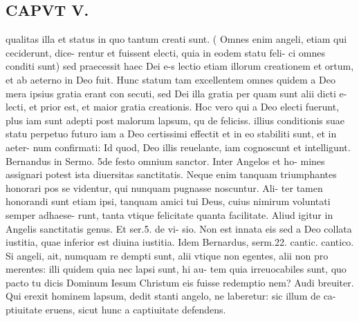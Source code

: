 \documentclass{article}
\begin{document}
\begin{pages}
\section*{CAPVT  V. }
\marginpar{[ p.335 ]}\pstart qualitas illa et status in quo tantum creati sunt. ( Omnes enim angeli, etiam qui ceciderunt, dice- rentur et fuissent electi, quia in eodem statu feli- ci omnes conditi sunt) sed praecessit haec Dei e-s lectio etiam illorum creationem et ortum, et ab aeterno in Deo fuit. Hunc statum tam excellentem omnes quidem a Deo mera ipsius gratia erant con secuti, sed Dei illa gratia per quam sunt alii dicti e- lecti, et prior est, et maior gratia creationis. Hoc vero qui a Deo electi fuerunt, plus iam sunt adepti post malorum lapsum, qu de feliciss. illius conditionis suae statu perpetuo futuro iam a Deo certissimi effectit et in eo stabiliti sunt, et in aeter- num confirmati: Id quod, Deo illis reuelante, iam cognoscunt et intelligunt. Bernandus in Sermo. 5de festo omnium sanctor. Inter Angelos et ho- mines assignari potest ista diuersitas sanctitatis. Neque enim tanquam triumphantes honorari pos se videntur, qui nunquam pugnasse noscuntur. Ali- ter tamen honorandi sunt etiam ipsi, tanquam amici tui Deus, cuius nimirum voluntati semper adhaese- runt, tanta vtique felicitate quanta facilitate. Aliud igitur in Angelis sanctitatis genus. Et ser.5. de vi- sio. Non est innata eis sed a Deo collata iustitia, quae inferior est diuina iustitia. Idem Bernardus, serm.22. cantic. cantico. Si angeli, ait, numquam re dempti sunt, alii vtique non egentes, alii non pro merentes: illi quidem quia nec lapsi sunt, hi au- tem quia irreuocabiles sunt, quo pacto tu dicis Dominum Iesum Christum eis fuisse redemptio nem? Audi breuiter. Qui erexit hominem lapsum, dedit stanti angelo, ne laberetur: sic illum de ca- ptiuitate eruens, sicut hunc a captiuitate defendens.  \pend

\end{pages}
\end{document}
